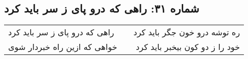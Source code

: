 \begin{center}
\section*{شماره ۳۱: راهی که درو پای ز سر باید کرد}
\label{sec:031}
\begin{longtable}{l p{0.5cm} r}
راهی که درو پای ز سر باید کرد
&&
ره توشه درو خون جگر باید کرد
\\
خواهی که ازین راه خبردار شوی
&&
خود را ز دو کون بیخبر باید کرد
\\
\end{longtable}
\end{center}
